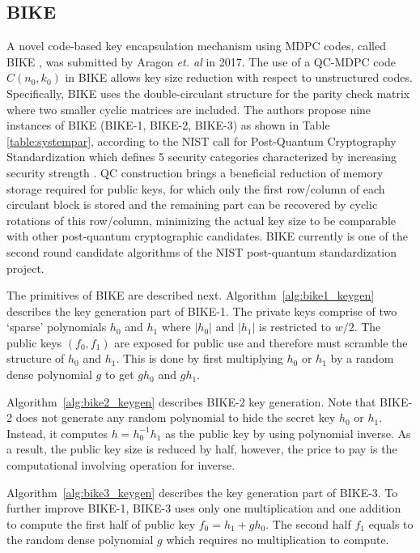 \documentclass[preprint]{iacrtrans}
\begin{document}
\subsection{BIKE}
A novel code-based key encapsulation mechanism using MDPC codes, called BIKE \cite{aragon2017bike}, was submitted by Aragon \textit{et. al} in 2017. The use of a QC-MDPC code $C(n_0,k_0)$ in BIKE allows key size reduction with respect to unstructured codes. Specifically, BIKE uses the double-circulant structure for the parity check matrix where two smaller cyclic matrices are included. The authors propose nine instances of BIKE (BIKE-1, BIKE-2, BIKE-3) as shown in Table \ref{table:systempar}, according to the NIST call for Post-Quantum Cryptography Standardization which defines 5 security categories characterized by increasing security strength \cite{pqc2017}.
 QC construction brings a beneficial reduction of memory storage required for public keys, for which only the first row/column of each circulant block is stored and the remaining part can be recovered by cyclic rotations of this row/column,  minimizing the actual key size to be comparable with other post-quantum cryptographic candidates.  BIKE currently is one of the second round candidate algorithms of the NIST post-quantum standardization project.

The primitives of BIKE are described next.
Algorithm~\ref{alg:bike1_keygen} describes the key generation part of BIKE-1. The private keys comprise of two `sparse' polynomials $h_0$ and $h_1$ where $|h_0|$ and $|h_1|$ is restricted to $w/2$. The public keys $(f_0,f_1)$ are exposed for public use and therefore must scramble the structure of $h_0$ and $h_1$. This is done by first multiplying $h_0$ or $h_1$ by a random dense polynomial $g$ to get $gh_0$ and $gh_1$.

Algorithm~\ref{alg:bike2_keygen} describes BIKE-2 key generation. Note that BIKE-2 does not generate any random polynomial to hide the secret key $h_0$ or $h_1$. Instead, it computes $h=h_0^{-1}h_1$ as the public key by using polynomial inverse. As a result, the public key size is reduced by half, however, the price to pay is the computational involving operation for inverse.

Algorithm~\ref{alg:bike3_keygen} describes the key generation part of BIKE-3. To further improve BIKE-1, BIKE-3 uses only one multiplication and one addition to compute the first half of public key $f_0=h_1+gh_0$. The second half $f_1$ equals to the random dense polynomial $g$ which requires no multiplication to compute.
\end{document}
